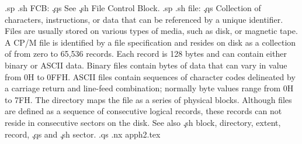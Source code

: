 .sp
.sh
FCB:  \c
.qs
See \c
.sh
File Control Block.
.sp
.sh
file:  \c
.qs
Collection of characters, instructions, or data that can be 
referenced by a unique identifier.  Files are usually stored on 
various types of media, such as disk, or magnetic 
tape.  A CP/M file is identified by a file specification and 
resides on disk as a collection of from zero to 65,536 records.  
Each record is 128 bytes and can contain either binary or ASCII 
data.  Binary files contain bytes of data that can vary in value 
from 0H to 0FFH.  ASCII files contain sequences of character 
codes delineated by a carriage return and line-feed combination; 
normally byte values range from 0H to 7FH.  The directory maps 
the file as a series of physical blocks.  Although files are 
defined as a sequence of consecutive logical records, these 
records can not reside in consecutive sectors on the disk.  See 
also \c
.sh
block, directory, extent, record, \c
.qs
and \c
.sh
sector.
.qs
.nx apph2.tex
